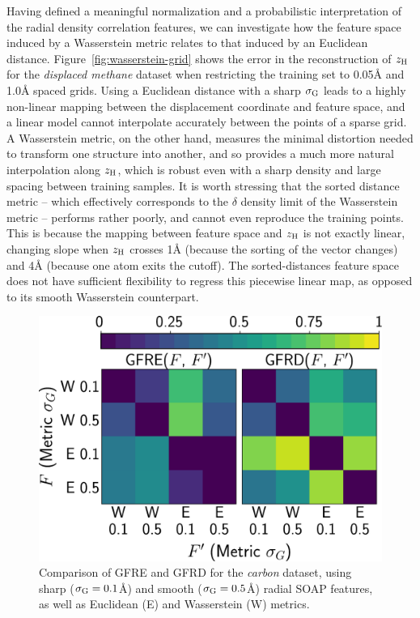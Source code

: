 Having defined a meaningful normalization and a probabilistic interpretation of the radial density correlation features, we can investigate how the feature space induced by a Wasserstein metric relates to that induced by an Euclidean distance. 
Figure~\ref{fig:wasserstein-grid} shows the error in the reconstruction of $\zh$ for the \emph{displaced methane} dataset when restricting the training set to 0.05\AA{} and 1.0\AA{} spaced grids.
Using a Euclidean distance with a sharp $\sigma_\text{G}$ leads to a highly non-linear mapping between the displacement coordinate and feature space, and a linear model cannot interpolate accurately between the points of a sparse grid. 
A Wasserstein metric, on the other hand, measures the minimal distortion needed to transform one structure into another, and so provides a much more natural interpolation along $\zh$, which is robust even with a sharp density and large spacing between training samples. 
It is worth stressing that the sorted distance metric -- which effectively corresponds to the $\delta$ density limit of the Wasserstein metric -- performs rather poorly, and cannot even reproduce the training points.
This is because the mapping between feature space and $\zh$ is not exactly linear, changing slope when $\zh$ crosses 1\AA{} (because the sorting of the vector changes)  and 4\AA{} (because one atom exits the cutoff). The sorted-distances feature space does not have sufficient flexibility to regress this piecewise linear map, as opposed to its smooth Wasserstein counterpart.

\begin{figure}
  \centering
  \includegraphics[width=0.6\linewidth]{fig/rof/distance_comparison-delta_wasserstein-carbon-inkscaped.pdf}
\caption{Comparison of GFRE and GFRD for the \emph{carbon} dataset, using sharp ($\sigma_\text{G}=0.1$\AA{}) and smooth ($\sigma_\text{G}=0.5$\AA{}) radial SOAP features, as well as Euclidean (E) and Wasserstein (W) metrics.}
\label{fig:wasserstein-carbon}
\end{figure}

